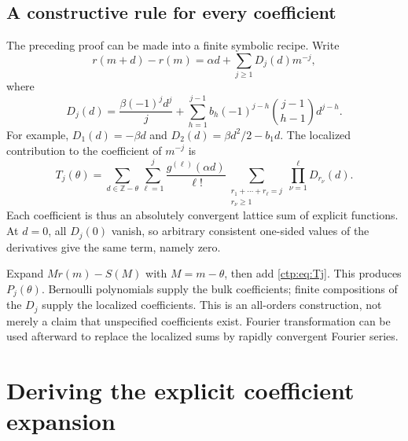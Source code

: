\documentclass[11pt,a4paper]{article}
\numberwithin{equation}{section}
\theoremstyle{definition}
\theoremstyle{remark}
\newcommand{\Z}{\mathbb Z}
\begin{document}
\subsection{A constructive rule for every coefficient}
\label{ctp:subsec:coefficient-rule}
The preceding proof can be made into a finite symbolic recipe. Write
\begin{equation}\label{ctp:eq:Dj}
 r(m+d)-r(m)=\alpha d+\sum_{j\geq1}D_j(d)m^{-j},
\end{equation}
where
\begin{equation}\label{ctp:eq:Dj-formula}
 D_j(d)=\frac{\beta(-1)^jd^j}{j}
 +\sum_{h=1}^{j-1}b_h(-1)^{j-h}
       \binom{j-1}{h-1}d^{j-h}.
\end{equation}
For example, $D_1(d)=-\beta d$ and
$D_2(d)=\beta d^2/2-b_1d$. The localized contribution to the coefficient
of $m^{-j}$ is
\begin{equation}\label{ctp:eq:Tj}
 T_j(\theta)=\sum_{d\in\Z-\theta}\sum_{\ell=1}^{j}
 \frac{g^{(\ell)}(\alpha d)}{\ell!}
 \sum_{\substack{r_1+\cdots+r_\ell=j\\r_\nu\geq1}}
       \prod_{\nu=1}^{\ell}D_{r_\nu}(d).
\end{equation}
Each coefficient is thus an absolutely convergent lattice sum of explicit
functions. At $d=0$, all $D_j(0)$ vanish, so arbitrary consistent one-sided
values of the derivatives give the same term, namely zero.

Expand $Mr(m)-S(M)$ with $M=m-\theta$, then add \eqref{ctp:eq:Tj}. This
produces $P_j(\theta)$. Bernoulli polynomials supply the bulk coefficients;
finite compositions of the $D_j$ supply the localized coefficients.
This is an all-orders construction, not merely a claim that unspecified
coefficients exist. Fourier transformation can be used afterward to
replace the localized sums by rapidly convergent Fourier series.

\section{Deriving the explicit coefficient expansion}
\label{ctp:sec:explicit-proof}
\end{document}
